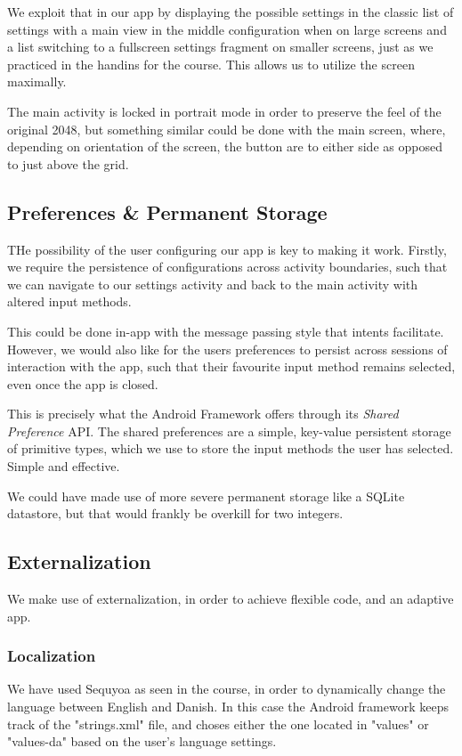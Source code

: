 \documentclass[a4paper, 12pt]{article}
\begin{document}
We exploit that in our app by displaying the possible settings in the
classic list of settings with a main view in the middle configuration
when on large screens and a list switching to a fullscreen settings
fragment on smaller screens, just as we practiced in the handins for
the course. This allows us to utilize the screen maximally.

The main activity is locked in portrait mode in order to preserve the
feel of the original 2048, but something similar could be done with
the main screen, where, depending on orientation of the screen, the
button are to either side as opposed to just above the grid.

\subsection{Preferences \& Permanent Storage}
THe possibility of the user configuring our app is key to making it
work. Firstly, we require the persistence of configurations across
activity boundaries, such that we can navigate to our settings
activity and back to the main activity with altered input methods.

This could be done in-app with the message passing style that intents
facilitate. However, we would also like for the users preferences to
persist across sessions of interaction with the app, such that their
favourite input method remains selected, even once the app is closed.

This is precisely what the Android Framework offers through its
\emph{Shared Preference} API. The shared preferences are a simple,
key-value persistent storage of primitive types, which we use to store
the input methods the user has selected. Simple and effective.

We could have made use of more severe permanent storage like a SQLite
datastore, but that would frankly be overkill for two integers.

\subsection{Externalization}
We make use of externalization, in order to achieve flexible code, and an adaptive app. 

\subsubsection{Localization}
We have used Sequyoa as seen in the course, in order to dynamically change the language between English and Danish. In this case the Android framework keeps track of the "strings.xml" file, and choses either the one located in "values" or "values-da" based on the user's language settings.
\end{document}
